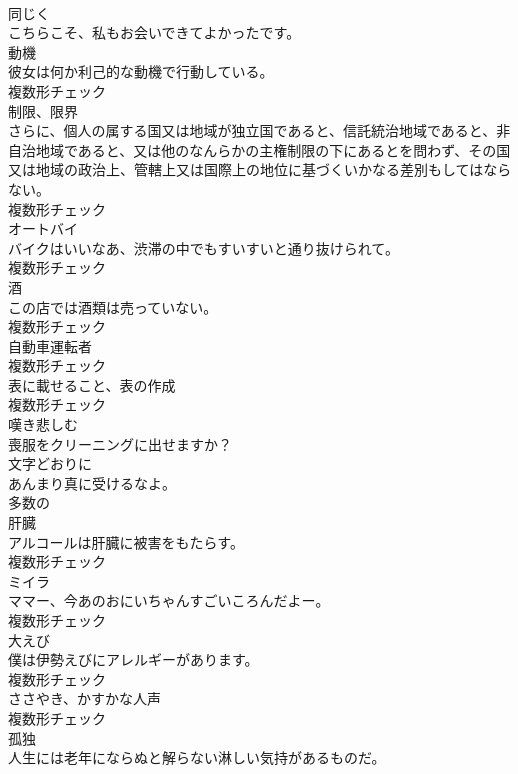 \documentclass[8pt]{extreport}
\begin{document}
\begin{CJK}{UTF8}{min}
\\	[副詞]	同じく	
\\	こちらこそ、私もお会いできてよかったです。	
\\	[名詞]	動機	
\\	彼女は何か利己的な動機で行動している。	
\\	複数形チェック
\\	[名詞]	制限、限界	
\\	さらに、個人の属する国又は地域が独立国であると、信託統治地域であると、非自治地域であると、又は他のなんらかの主権制限の下にあるとを問わず、その国又は地域の政治上、管轄上又は国際上の地位に基づくいかなる差別もしてはならない。	
\\	複数形チェック
\\	[名詞]	オートバイ	
\\	バイクはいいなあ、渋滞の中でもすいすいと通り抜けられて。	
\\	複数形チェック
\\	[名詞]	酒	
\\	この店では酒類は売っていない。	
\\	複数形チェック
\\	[名詞]	自動車運転者	
\\	複数形チェック
\\	[名詞]	表に載せること、表の作成	
\\	複数形チェック
\\	[動詞]	嘆き悲しむ	
\\	喪服をクリーニングに出せますか？	
\\	[副詞]	文字どおりに	
\\	あんまり真に受けるなよ。	
\\	[形容詞]	多数の	
\\	[名詞]	肝臓	
\\	アルコールは肝臓に被害をもたらす。	
\\	複数形チェック
\\	[名詞]	ミイラ	
\\	ママー、今あのおにいちゃんすごいころんだよー。	
\\	複数形チェック
\\	[名詞]	大えび	
\\	僕は伊勢えびにアレルギーがあります。	
\\	複数形チェック
\\	[名詞]	ささやき、かすかな人声	
\\	複数形チェック
\\	[名詞]	孤独	
\\	人生には老年にならぬと解らない淋しい気持があるものだ。	

\end{CJK}
\end{document}
